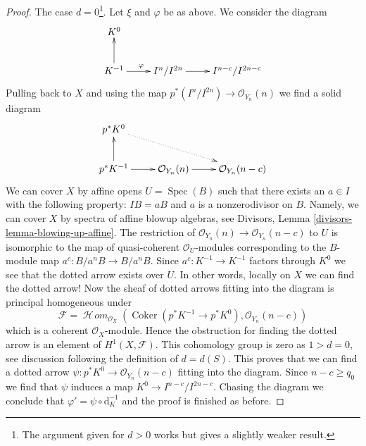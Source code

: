\documentclass{stacks-project}
\theoremstyle{plain}
\theoremstyle{definition}
\theoremstyle{remark}
\numberwithin{equation}{subsection}
\def\Spec{\mathop{\mathrm{Spec}}}
\def\SheafHom{\mathop{\mathcal{H}\!\mathit{om}}\nolimits}
\def\Coker{\mathop{\mathrm{Coker}}}
\begin{document}
\begin{proof}
\medskip\noindent
The case $d = 0$\footnote{The argument given for $d > 0$ works but gives
a slightly weaker result.}. Let $\xi$ and $\varphi$ be as above.
We consider the diagram
$$
\xymatrix{
K^0 \\
K^{-1} \ar[u] \ar[r]^\varphi & I^n/I^{2n} \ar[r] & I^{n - c}/I^{2n - c}
}
$$
Pulling back to $X$ and using the map
$p^*(I^n/I^{2n}) \to \mathcal{O}_{Y_n}(n)$
we find a solid diagram
$$
\xymatrix{
p^*K^0 \ar@{..>}[rrd] \\
p^*K^{-1} \ar[u] \ar[r] &
\mathcal{O}_{Y_n}(n) \ar[r] &
\mathcal{O}_{Y_n}(n - c)
}
$$
We can cover $X$ by affine opens $U = \Spec(B)$ such that there
exists an $a \in I$ with the following property: $IB = aB$
and $a$ is a nonzerodivisor on $B$. Namely, we can cover
$X$ by spectra of affine blowup algebras, see
Divisors, Lemma \ref{divisors-lemma-blowing-up-affine}.
The restriction of $\mathcal{O}_{Y_n}(n) \to \mathcal{O}_{Y_n}(n - c)$
to $U$ is isomorphic to the map of quasi-coherent $\mathcal{O}_U$-modules
corresponding to the $B$-module map $a^c : B/a^nB \to B/a^nB$.
Since $a^c : K^{-1} \to K^{-1}$ factors through $K^0$ we see that
the dotted arrow exists over $U$. In other words,
locally on $X$ we can find the dotted arrow! Now the sheaf of dotted
arrows fitting into the diagram is principal homogeneous under
$$
\mathcal{F} = \SheafHom_{\mathcal{O}_X}(
\Coker(p^*K^{-1} \to p^*K^0), \mathcal{O}_{Y_n}(n - c))
$$
which is a coherent $\mathcal{O}_X$-module.
Hence the obstruction for finding the dotted arrow is an element
of $H^1(X, \mathcal{F})$. This cohomology group is zero as
$1 > d = 0$, see discussion following the definition of $d = d(S)$.
This proves that we can find a dotted arrow
$\psi : p^*K^0 \to \mathcal{O}_{Y_n}(n - c)$
fitting into the diagram. Since $n - c \geq q_0$
we find that $\psi$ induces a map $K^0 \to I^{n - c}/I^{2n - c}$.
Chasing the diagram we conclude that $\varphi' = \psi \circ \text{d}_K^{-1}$
and the proof is finished as before.
\end{proof}










\end{document}
